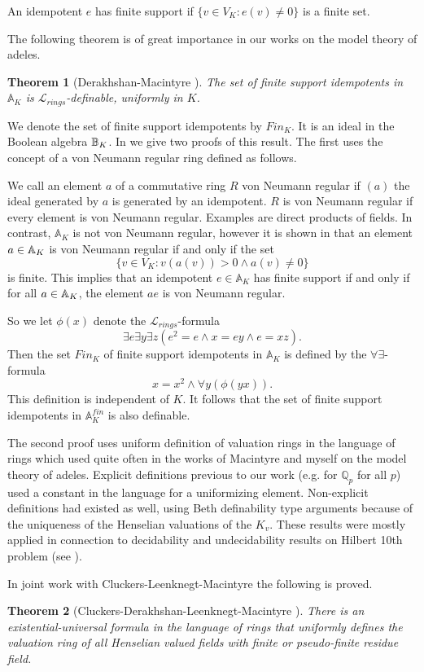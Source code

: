 \documentclass[12pt]{amsart}
\def\A{\mathbb{A}}
\def\cL{\mathcal{L}}
\def\Q{\mathbb{Q}}
\def\cL{\mathcal{L}}
\newtheorem{thm}{Theorem}[section]
\numberwithin{equation}{section}
\begin{document}
An idempotent $e$ has finite support if $\{v\in V_K: e(v)\neq 0\}$ is a finite set. 

The following theorem is of great importance in our works on the model theory of adeles.

\begin{thm}[Derakhshan-Macintyre {\cite{DM-ad}}] 
\label{defid}The set of finite support idempotents in $\A_K$ is $\cL_{rings}$-definable, uniformly in $K$.\end{thm} 
We denote the set of finite support idempotents by $Fin_K$. It is an ideal in the Boolean algebra $\Bbb B_K$. In 
\cite{DM-ad} we give two proofs of this result. The first uses the concept of a von Neumann regular ring defined as follows. 

We call an element $a$ of a commutative ring $R$ von Neumann regular if $(a)$  the ideal generated by 
$a$ is generated by an idempotent. $R$ is von Neumann regular if every element is 
von Neumann regular. Examples are direct products of fields. In contrast, $\A_K$ is not von Neumann regular, however it is shown in \cite{DM-ad} that an element $a\in \Bbb A_K$ is von Neumann regular if and only if the set 
$$\{v\in V_K: v(a(v))>0 \wedge a(v)\neq 0\}$$ is finite. This implies that an idempotent $e\in \A_K$  
has finite support if and only if for all $a\in \Bbb A_K$, the element $ae$ is von Neumann regular.

So we let $\phi(x)$ denote the $\cL_{rings}$-formula 
$$\exists e \exists y \exists z (e^2=e \wedge x=ey \wedge e=xz).$$ 
Then the set $Fin_K$ of finite support idempotents in $\A_K$ is defined by the $\forall \exists$-formula
$$x=x^2 \wedge \forall y (\phi(yx)).$$
This definition is independent of $K$. It follows that the set of finite support idempotents in $\A_K^{fin}$ is also definable. 

The second proof uses uniform definition of valuation rings in the language of rings which used quite often in the works of Macintyre and myself on the model theory of adeles. 
Explicit definitions previous to our work (e.g. for $\Q_p$ for all $p$) used a constant in the language for a 
uniformizing element. Non-explicit definitions had existed as well, using Beth definability type arguments because of the uniqueness of the Henselian valuations of the $K_v$. These results were mostly 
applied in connection to decidability and undecidability results on Hilbert 10th problem (see \cite{Koenigsmann}). 

In joint work with Cluckers-Leenknegt-Macintyre \cite{CDLM} the following is proved.
\begin{thm}[Cluckers-Derakhshan-Leenknegt-Macintyre {\cite[Theorem 2]{CDLM}}]
\label{CDLM-th} 
There is an existential-universal formula in the language of rings that uniformly defines the valuation ring of all Henselian valued fields with finite or pseudo-finite residue field.
\end{thm}
\end{document}
